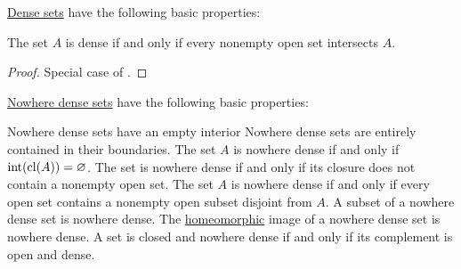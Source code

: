 \begin{proposition}\label{thm:def:dense_set/properties}
  \hyperref[def:topologically_dense_set/dense]{Dense sets} have the following basic properties:
  \begin{thmenum}
     The set \( A \) is dense if and only if every nonempty open set intersects \( A \).
  \end{thmenum}
\end{proposition}
\begin{proof}
   Special case of .
\end{proof}

\begin{proposition}\label{thm:def:nowhere_dense/properties}
  \hyperref[def:topologically_dense_set/nowhere_dense]{Nowhere dense sets} have the following basic properties:
  \begin{thmenum}
     Nowhere dense sets have an empty interior
     Nowhere dense sets are entirely contained in their boundaries.
     The set \( A \) is nowhere dense if and only if \( \operatorname{int}(\operatorname{cl}(A)) = \varnothing \).
     The set is nowhere dense if and only if its closure does not contain a nonempty open set.
    The set \( A \) is nowhere dense if and only if every open set contains a nonempty open subset disjoint from \( A \).
     A subset of a nowhere dense set is nowhere dense.
     The \hyperref[def:homeomorphism]{homeomorphic} image of a nowhere dense set is nowhere dense.
     A set is closed and nowhere dense if and only if its complement is open and dense.
  \end{thmenum}
\end{proposition}
